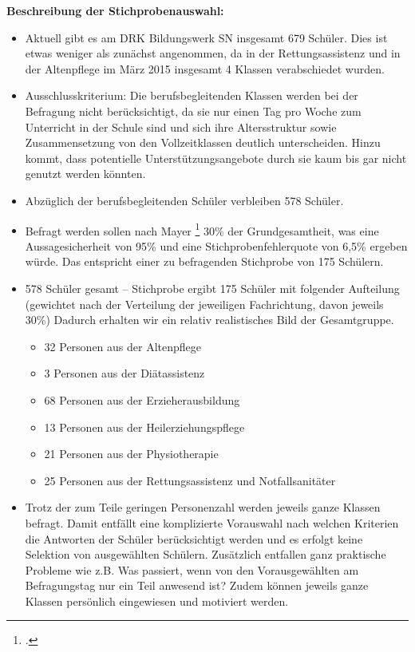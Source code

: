 \textbf{Beschreibung der Stichprobenauswahl:}
\begin{itemize}
	\item Aktuell gibt es am DRK Bildungswerk SN insgesamt 679 Schüler. Dies ist etwas weniger als zunächst angenommen, da in der Rettungsassistenz und in der Altenpflege im März 2015 insgesamt 4 Klassen verabschiedet wurden.
	\item Ausschlusskriterium: Die berufsbegleitenden Klassen werden bei der Befragung nicht berücksichtigt, da sie nur einen Tag pro Woche zum Unterricht in der Schule sind und sich ihre Altersstruktur sowie Zusammensetzung von den Vollzeitklassen deutlich unterscheiden. Hinzu kommt, dass potentielle Unterstützungsangebote durch sie kaum bis gar nicht genutzt werden könnten.
	\item Abzüglich der berufsbegleitenden Schüler verbleiben 578 Schüler.
	\item Befragt werden sollen nach Mayer \footcite[vgl.][66]{Mayer2013} 30\% der Grundgesamtheit, was eine Aussagesicherheit von 95\% und eine Stichprobenfehlerquote von 6,5\% ergeben würde. Das entspricht einer zu befragenden Stichprobe von 175 Schülern.
	\item 578 Schüler gesamt -- Stichprobe ergibt 175 Schüler mit folgender Aufteilung (gewichtet nach der Verteilung der jeweiligen Fachrichtung, davon jeweils 30\%) Dadurch erhalten wir ein relativ realistisches Bild der Gesamtgruppe. 
		\begin{itemize}
			\item 32 Personen aus der Altenpflege 
			\item 3 Personen aus der Diätassistenz
			\item 68 Personen aus der Erzieherausbildung 
			\item 13 Personen aus der Heilerziehungspflege 
			\item 21 Personen aus der Physiotherapie
			\item 25 Personen aus der Rettungsassistenz und Notfallsanitäter
		\end{itemize}
	\item Trotz der zum Teile geringen Personenzahl werden jeweils ganze Klassen befragt. Damit entfällt eine komplizierte Vorauswahl nach welchen Kriterien die Antworten der Schüler berücksichtigt werden und es erfolgt keine Selektion von ausgewählten Schülern. Zusätzlich entfallen ganz praktische Probleme wie z.B. Was passiert, wenn von den Vorausgewählten am Befragungstag nur ein Teil anwesend ist? Zudem können jeweils ganze Klassen persönlich eingewiesen und motiviert werden.

\end{itemize}
